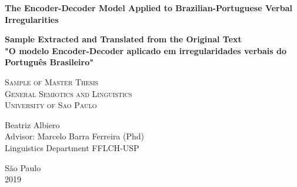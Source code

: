 \thispagestyle{empty}
\begin{center}
    \vspace*{2.3cm}
    \textbf{\Large{The Encoder-Decoder Model Applied to Brazilian-Portuguese Verbal Irregularities 
}}\\
    
\vspace{0.5 cm}
\begin{center}
  \large{\textbf{Sample Extracted and Translated from the Original Text \\
  "O modelo Encoder-Decoder aplicado em irregularidades verbais do Português Brasileiro"}}  
\end{center}


    
    \vskip 2cm
    \textsc{
    Sample of Master Thesis\\[+0.5cm]
    General Semiotics and Linguistics\\[+0.5cm]
    University of Sao Paulo\\[+0.5cm]
   }
    
    \vspace*{6.2cm}
    Beatriz Albiero\\
    Advisor: Marcelo Barra Ferreira (Phd)\\
    Linguistics Department FFLCH-USP
    
    \vskip 0.5cm
    \normalsize{São Paulo\\ 2019}
\end{center}